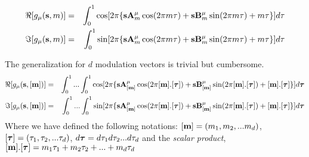 \documentclass[10pt]{article}
\newcommand{\bftau}{\mbox{\boldmath$\tau$}}
\newcommand{\bmr}[1]{\mbox{{\bf #1}}}  %
\begin{document}
\begin{eqnarray} \label{modul_factor3}
\Re[g_\mu({\bf s},m)]&=& \int_{0}^{1}  \cos [2 \pi \{{\bf s}{\bf A}_m^{\mu} \cos(2\pi m \tau)+ {\bf s}{\bf B}_m^{\mu} \sin(2\pi m \tau)+m\tau\}] d\tau \\
\Im[g_\mu({\bf s},m)]&=& \int_{0}^{1}  \sin [2 \pi \{{\bf s}{\bf A}_m^{\mu} \cos(2\pi m \tau)+ {\bf s}{\bf B}_m^{\mu} \sin(2\pi m \tau)+m\tau\}] d\tau 
\end{eqnarray}

The generalization for $d$ modulation vectors is trivial but cumbersome.
\begin{eqnarray} \label{modul_factor3}
\Re[g_\mu({\bf s},[{\bf m}])]&=& \int_{0}^{1} ...\int_{0}^{1}  \cos [2 \pi \{{\bf s}{\bf A}_{[{\bf m}]}^{\mu} \cos(2\pi [{\bf m}].[\bftau] )+ {\bf s}{\bf B}_{[{\bf m}]}^{\mu} \sin(2\pi [{\bf m}].[\bftau])+[{\bf m}].[\bftau]\}] d\bftau \\
\Im[g_\mu({\bf s},[{\bf m}])]&=& \int_{0}^{1} ...\int_{0}^{1} \sin [2 \pi \{{\bf s}{\bf A}_{[{\bf m}]}^{\mu} \cos(2\pi[{\bf m}].[\bftau] )+ {\bf s}{\bf B}_{[{\bf m}]}^{\mu} \sin(2\pi [{\bf m}].[\bftau] )+[{\bf m}].[\bftau] \}] d\bftau 
\end{eqnarray}
Where we have defined the following notations: $[{\bf m}] = (m_1,m_2,...m_d)$, $[\bftau] = (\tau_1,\tau_2,...\tau_d)$, $d\bftau = d\tau_1 d\tau_2...d\tau_d$  and the {\it scalar product}, $[{\bf m}].[\bftau]=m_1\tau_1+m_2\tau_2+...+m_d\tau_d$



\end{document}
